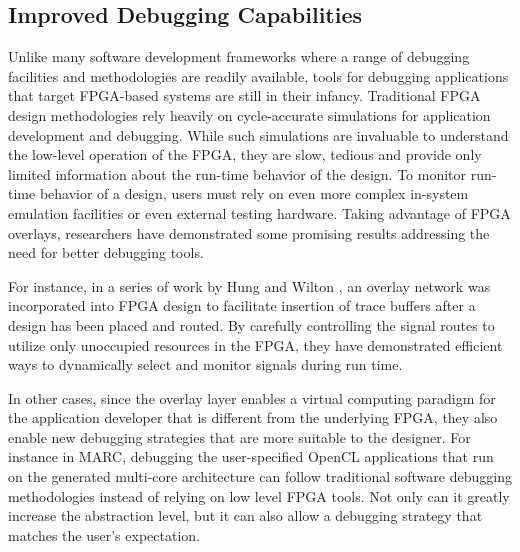 \subsection{Improved Debugging Capabilities}
Unlike many software development frameworks where a range of debugging facilities and methodologies are readily available, tools for debugging applications that target FPGA-based systems are still in their infancy.
Traditional FPGA design methodologies rely heavily on cycle-accurate simulations for application development and debugging.
While such simulations are invaluable to understand the low-level operation of the FPGA, they are slow, tedious and provide only limited information about the run-time behavior of the design.
To monitor run-time behavior of a design, users must rely on even more complex in-system emulation facilities or even external testing hardware.
Taking advantage of FPGA overlays, researchers have demonstrated some promising results addressing the need for better debugging tools.

For instance, in a series of work by Hung and Wilton \cite{Hung:2014:VLSI,Hung:2013:TSO:2435264.2435272}, an overlay network was incorporated into FPGA design to facilitate insertion of trace buffers after a design has been placed and routed.
By carefully controlling the signal routes to utilize only unoccupied resources in the FPGA, they have demonstrated efficient ways to dynamically select and monitor signals during run time.

In other cases, since the overlay layer enables a virtual computing paradigm for the application developer that is different from the underlying FPGA, they also enable new debugging strategies that are more suitable to the designer. For instance in MARC, debugging the user-specified OpenCL applications that run on the generated multi-core architecture can follow traditional software debugging methodologies instead of relying on low level FPGA tools.
Not only can it greatly increase the abstraction level, but it can also allow a debugging strategy that matches the user's expectation.

